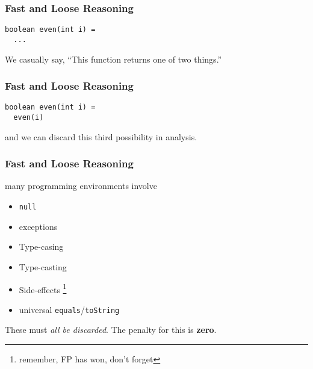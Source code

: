 \begin{frame}[fragile]
\frametitle{Fast and Loose Reasoning}
\begin{lstlisting}
boolean even(int i) =
  ...
\end{lstlisting}
We casually say, ``This function returns one of two things.''
\end{frame}

\begin{frame}[fragile]
\frametitle{Fast and Loose Reasoning}
\begin{lstlisting}
boolean even(int i) =
  even(i)
\end{lstlisting}
and we can discard this third possibility in analysis.
\end{frame}

\begin{frame}[fragile]
\frametitle{Fast and Loose Reasoning}
\begin{block}{many programming environments involve}
\begin{itemize}
  \item \lstinline{null}
  \item exceptions
  \item Type-casing
  \item Type-casting
  \item Side-effects \footnote{remember, FP has won, don't forget}
  \item universal \lstinline{equals}/\lstinline{toString}
\end{itemize}
\end{block}
These must \emph{all be discarded}. The penalty for this is \textbf{zero}.
\end{frame}
